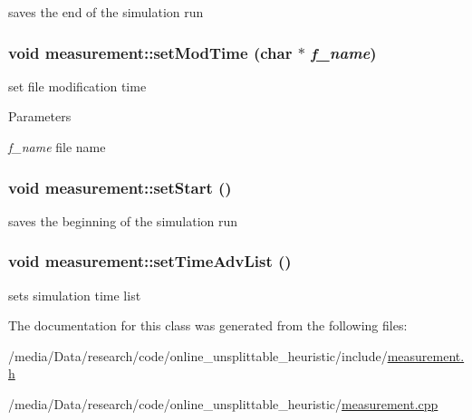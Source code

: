saves the end of the simulation run 

\hypertarget{classmeasurement_ae5af86c6b09d4bc3bd8f648c371a3f9c}{
\subsubsection[{setModTime}]{\setlength{\rightskip}{0pt plus 5cm}void measurement::setModTime (char $\ast$ {\em f\_\-name})}}
\label{classmeasurement_ae5af86c6b09d4bc3bd8f648c371a3f9c}


set file modification time 


\begin{DoxyParams}{Parameters}
\item[{\em f\_\-name}]file name \end{DoxyParams}
\hypertarget{classmeasurement_a18541883e2ecd3b899577809bc318987}{
\subsubsection[{setStart}]{\setlength{\rightskip}{0pt plus 5cm}void measurement::setStart ()}}
\label{classmeasurement_a18541883e2ecd3b899577809bc318987}


saves the beginning of the simulation run 

\hypertarget{classmeasurement_ab92b9dab0ee6ac312170b5536858fc8c}{
\subsubsection[{setTimeAdvList}]{\setlength{\rightskip}{0pt plus 5cm}void measurement::setTimeAdvList ()}}
\label{classmeasurement_ab92b9dab0ee6ac312170b5536858fc8c}


sets simulation time list 



The documentation for this class was generated from the following files:\begin{DoxyCompactItemize}
\item 
/media/Data/research/code/online\_\-unsplittable\_\-heuristic/include/\hyperlink{measurement_8h}{measurement.h}\item 
/media/Data/research/code/online\_\-unsplittable\_\-heuristic/\hyperlink{measurement_8cpp}{measurement.cpp}\end{DoxyCompactItemize}
